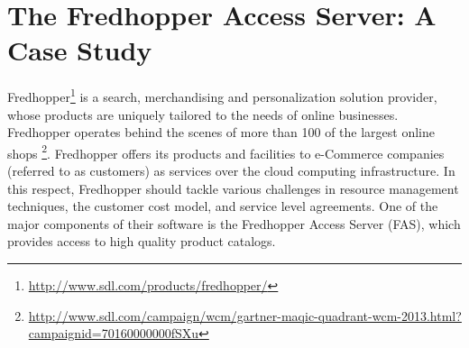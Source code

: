 \section{The Fredhopper Access Server: A Case Study} \label{sec:frh}

Fredhopper\footnote{\url{http://www.sdl.com/products/fredhopper/}} is a
search, merchandising and personalization solution provider, whose
products are uniquely tailored to the needs of online businesses. Fredhopper operates behind the scenes of more than 100 of the largest online
shops
\footnote{\url{http://www.sdl.com/campaign/wcm/gartner-maqic-quadrant-wcm-2013.html?campaignid=70160000000fSXu}}.
Fredhopper offers its products and facilities to e-Commerce
companies (referred to as customers) as services over the cloud computing infrastructure.
In this respect, Fredhopper should tackle various challenges in
resource management techniques, the customer cost model, and service level agreements.
One of the major components of their software is the Fredhopper Access Server (FAS), which provides access to high quality product catalogs.

